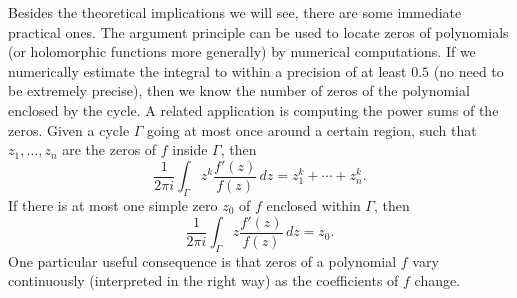 \documentclass[12pt,openany]{book}
\theoremstyle{plain}
\theoremstyle{remark}
\theoremstyle{definition}
\theoremstyle{exercise}
\theoremstyle{example}
\begin{document}
Besides the theoretical implications we will see,
there are some immediate practical ones.
The argument principle can be used to locate zeros of polynomials
(or holomorphic functions more generally)
by numerical computations.  If we numerically estimate the integral to
within a precision of at least $0.5$ (no need to be extremely precise),
then we know the number of zeros 
of the polynomial enclosed by the cycle.
A related application is computing the power sums of the zeros.
Given a cycle $\Gamma$ going at most
once around a certain region, such that $z_1,\ldots,z_n$ are the zeros of $f$
inside $\Gamma$, then
\begin{equation*}
\frac{1}{2\pi i}
\int_\Gamma z^k \frac{f'(z)}{f(z)} \, dz
=
z_1^k + \cdots + z_n^k .
\end{equation*}
If there is at most one simple zero $z_0$ of
$f$ enclosed within $\Gamma$, then
\begin{equation*}
\frac{1}{2\pi i}
\int_\Gamma z \frac{f'(z)}{f(z)} \, dz
=
z_0 .
\end{equation*}
One particular useful consequence is that zeros of a polynomial $f$ vary continuously
(interpreted in the right way) as the coefficients of $f$ change.
\end{document}
